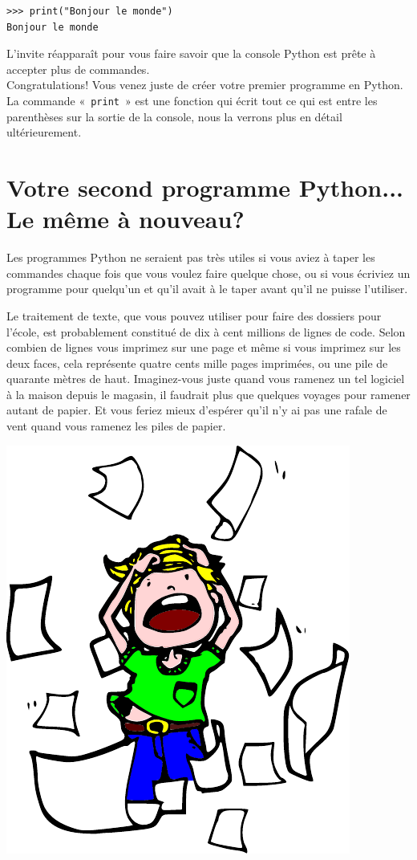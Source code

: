 \begin{Verbatim}[frame=single,rulecolor=\color{mbleu}, label=à taper si cela n'est pas déjà fait]
>>> print("Bonjour le monde")
Bonjour le monde
\end{Verbatim}


L'invite réapparaît pour vous faire savoir que la console Python est prête à accepter plus de commandes.\\


Congratulations! Vous venez juste de créer votre premier programme en Python. La commande «~\verb+print+~» est une fonction qui écrit tout ce qui est entre les parenthèses sur la sortie de la console, nous la verrons plus en détail ultérieurement.

\section{Votre second programme Python... Le même à nouveau?}

Les programmes Python ne seraient pas très utiles si vous aviez à taper les commandes chaque fois que vous voulez faire quelque chose, ou si vous écriviez un programme pour quel\-qu'un et qu'il avait à le taper avant qu'il ne puisse l'utiliser.

Le traitement de texte, que vous pouvez utiliser pour faire des dossiers pour l'école, est probablement constitué de dix à cent millions de lignes de code. Selon combien de lignes vous imprimez sur une page et même si vous imprimez sur les deux faces, cela représente quatre cents mille pages imprimées, ou une pile de quarante mètres de haut. Imaginez-vous juste quand vous ramenez un tel logiciel à la maison depuis le magasin, il faudrait plus que quelques voyages pour ramener autant de papier. Et vous feriez mieux d'espérer qu'il n'y ai pas une rafale de vent quand vous ramenez les piles de papier.

\begin{center}
\includegraphics[scale=1]{images/encore.pdf} 
\end{center} 

